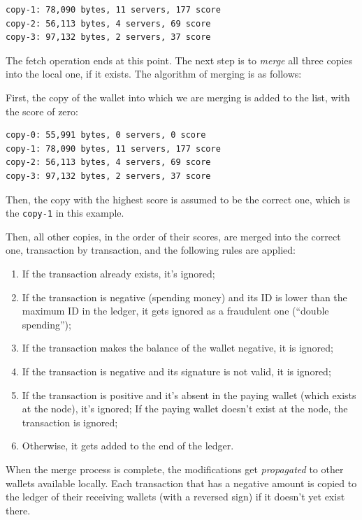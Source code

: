 \documentclass[11pt,oneside]{article}
\newcommand\dd[1]{\colorbox{gray!30}{\texttt{#1}}}
\begin{document}
\begin{verbatim}
copy-1: 78,090 bytes, 11 servers, 177 score
copy-2: 56,113 bytes, 4 servers, 69 score
copy-3: 97,132 bytes, 2 servers, 37 score
\end{verbatim}

The fetch operation ends at this point. The next step is to \emph{merge}
all three copies into the local one, if it exists. The algorithm of merging
is as follows:

First, the copy of the wallet into which we are merging is added to the list,
with the score of zero:

\begin{verbatim}
copy-0: 55,991 bytes, 0 servers, 0 score
copy-1: 78,090 bytes, 11 servers, 177 score
copy-2: 56,113 bytes, 4 servers, 69 score
copy-3: 97,132 bytes, 2 servers, 37 score
\end{verbatim}

Then, the copy with the highest score is assumed to be the correct one,
which is the \dd{copy-1} in this example.

Then, all other copies, in the order of their scores, are merged into the
correct one, transaction by transaction, and the following rules are applied:

\begin{enumerate}
\item If the transaction already exists, it's ignored;
\item If the transaction is negative (spending money) and its ID is lower than
the maximum ID in the ledger, it gets ignored as a fraudulent one (``double spending'');
\item If the transaction makes the balance of the wallet negative, it is ignored;
\item If the transaction is negative and its signature is not valid, it is ignored;
\item If the transaction is positive and it's absent in the paying wallet
(which exists at the node), it's ignored; If the paying wallet doesn't exist at the node,
the transaction is ignored;
\item Otherwise, it gets added to the end of the ledger.
\end{enumerate}

When the merge process is complete, the modifications get \emph{propagated} to other wallets
available locally. Each transaction that has a negative amount is
copied to the ledger of their receiving wallets (with a reversed sign)
if it doesn't yet exist there.
\end{document}
